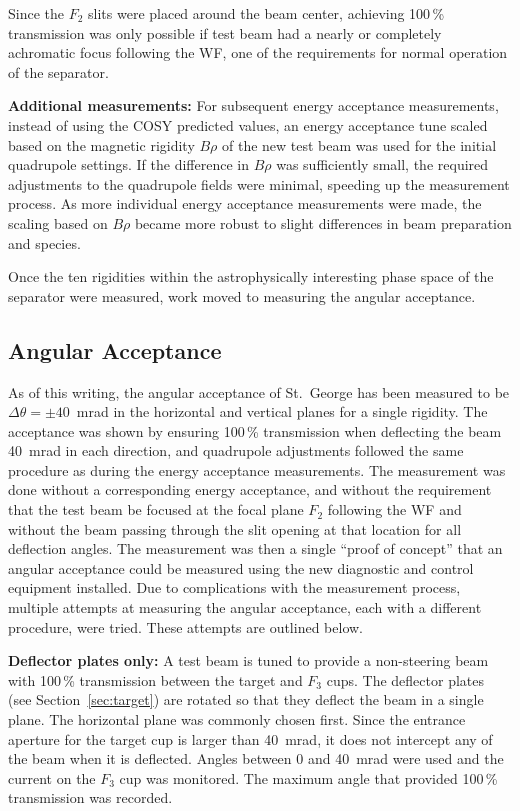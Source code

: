 Since the $F_2$ slits were placed around the beam center, achieving 100\,\%
transmission was only possible if test beam had a nearly or completely
achromatic focus following the WF, one of the requirements for normal
operation of the separator.

\textbf{Additional measurements:}
For subsequent energy acceptance measurements, instead of using the COSY
predicted values, an energy acceptance tune scaled based on the magnetic
rigidity $B\rho$ of the new test beam was used for the initial quadrupole
settings. If the difference in $B\rho$ was sufficiently small, the required
adjustments to the quadrupole fields were minimal, speeding up the measurement
process. As more individual energy acceptance measurements were made, the
scaling based on $B\rho$ became more robust to slight differences in beam
preparation and species.

Once the ten rigidities within the astrophysically interesting phase space of
the separator were measured, work moved to measuring the angular acceptance.


\subsection{Angular Acceptance}

As of this writing, the angular acceptance of St.\ George has been measured to
be $\Delta\theta = \pm 40$~mrad in the horizontal and vertical planes for a
single rigidity. The acceptance was shown by ensuring 100\,\% transmission
when deflecting the beam 40~mrad in each direction, and quadrupole adjustments
followed the same procedure as during the energy acceptance measurements. The
measurement was done without a corresponding energy acceptance, and without the
requirement that the test beam be focused at the focal plane $F_2$ following
the WF and without the beam passing through the slit opening at that
location for all deflection angles. The measurement was then a single ``proof
of concept'' that an angular acceptance could be measured using the new
diagnostic and control equipment installed. Due to complications with the
measurement process, multiple attempts at measuring the angular acceptance,
each with a different procedure, were tried. These attempts are outlined below.

\textbf{Deflector plates only:}
A test beam is tuned to provide a non-steering beam with 100\,\% transmission
between the target and $F_3$ cups. The deflector plates (see
Section~\ref{sec:target}) are rotated so that they deflect the beam in a single
plane. The horizontal plane was commonly chosen first. Since the entrance
aperture for the target cup is larger than 40~mrad, it does not intercept any
of the beam when it is deflected. Angles between 0 and 40~mrad were used and
the current on the $F_3$ cup was monitored. The maximum angle that provided
100\,\% transmission was recorded.


